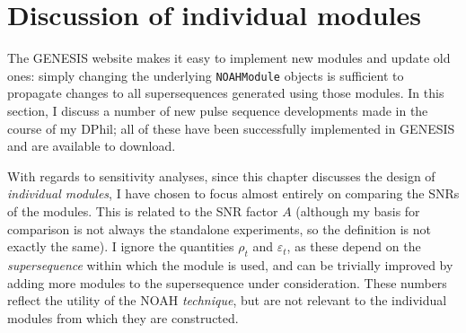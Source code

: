 \section{Discussion of individual modules}
\label{sec:noah__modules}

The GENESIS website makes it easy to implement new modules and update old ones: simply changing the underlying \texttt{NOAHModule} objects is sufficient to propagate changes to all supersequences generated using those modules.
In this section, I discuss a number of new pulse sequence developments made in the course of my DPhil; all of these have been successfully implemented in GENESIS and are available to download.

With regards to sensitivity analyses, since this chapter discusses the design of \textit{individual modules}, I have chosen to focus almost entirely on comparing the SNRs of the modules.
This is related to the SNR factor $A$ (although my basis for comparison is not always the standalone experiments, so the definition is not exactly the same).
I ignore the quantities $\rho_t$ and $\varepsilon_t$, as these depend on the \textit{supersequence} within which the module is used, and can be trivially improved by adding more modules to the supersequence under consideration.
These numbers reflect the utility of the NOAH \textit{technique}, but are not relevant to the individual modules from which they are constructed.









